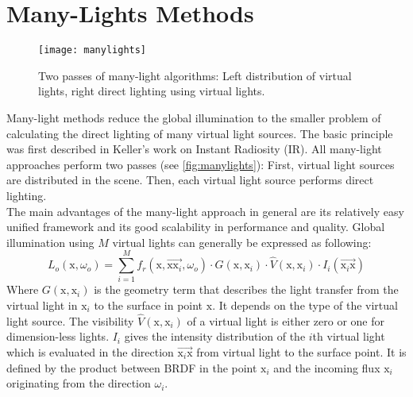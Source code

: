 \documentclass[thesis.tex]{subfiles}
\begin{document}
\section {Many-Lights Methods} \label{sec:prev:manylights}
\begin{figure}[h]
	\centering
	\texttt{[image: manylights]}
	\caption{\cite{bib:manylightssurvey2014} Two passes of many-light algorithms: Left distribution of virtual lights, right direct lighting using virtual lights.} \label{fig:manylights}
\end{figure}
Many-light methods reduce the global illumination to the smaller problem of calculating the direct lighting of many virtual light sources.
The basic principle was first described in Keller's work on Instant Radiosity \cite{bib:instantradiosity} (IR).
All many-light approaches perform two passes (see \autoref{fig:manylights}):
First, virtual light sources are distributed in the scene.
Then, each virtual light source performs direct lighting.
\\
The main advantages of the many-light approach in general are its relatively easy unified framework and its good scalability in performance and quality.
Global illumination using $M$ virtual lights can generally be expressed as following:
\begin{equation}
L_o(\mathrm{x}, \omega_o) = \sum\limits_{i=1}^{M} f_r(\mathrm{x}, \overrightarrow{\mathrm{x}\mathrm{x}_i}, \omega_o) \cdot G(\mathrm{x}, \mathrm{x}_i) \cdot \hat{V}(\mathrm{x}, \mathrm{x}_i) \cdot I_i(\overrightarrow{\mathrm{x}_i\mathrm{x}})
\end{equation}
Where $G(\mathrm{x}, \mathrm{x}_i)$ is the geometry term that describes the light transfer from the virtual light in $\mathrm{x}_i$ to the surface in point $\mathrm{x}$.
It depends on the type of the virtual light source.
The visibility $\hat{V}(\mathrm{x}, \mathrm{x}_i)$ of a virtual light is either zero or one for dimension-less lights. %
$I_i$ gives the intensity distribution of the $i$th virtual light which is evaluated in the direction $\overrightarrow{\mathrm{x}_i\mathrm{x}}$ from virtual light to the surface point.
It is defined by the product between BRDF in the point $\mathrm{x}_i$ and the incoming flux $\mathrm{x}_i$ originating from the direction $\omega_i$.
\end{document}
